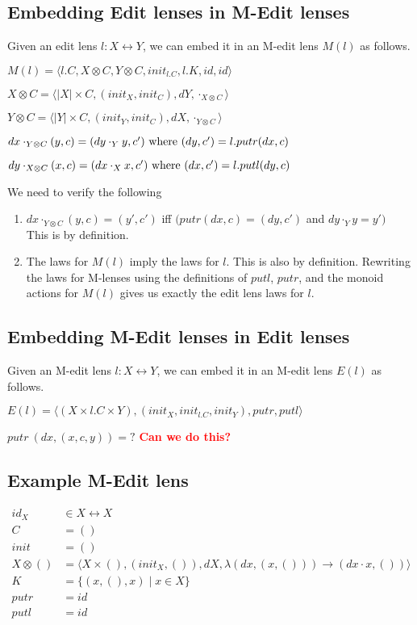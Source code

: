 \documentclass[a4paper,10pt]{article}
\newcommand{\finish}[1]{#1}
\newcommand{\comment}[1]{\finish{\textbf{\textcolor{red}{#1}}}}
\begin{document}
\subsection{Embedding Edit lenses in M-Edit lenses}
Given an edit lens $l:X \leftrightarrow Y$, we can embed it in an M-edit lens $M(l)$ as follows. 

$M(l) = \langle l.C, X \otimes C, Y \otimes C, init_{l.C}, l.K, id, id \rangle$

$X \otimes C = \langle |X| \times C, (init_X, init_C), dY, \cdot_{X \otimes C} \rangle$

$Y \otimes C = \langle |Y| \times C, (init_Y, init_C), dX, \cdot_{Y \otimes C} \rangle$

$ dx \cdot_{Y \otimes C} (y,c) = (dy \cdot_Y y, c') \textnormal{ where } (dy, c') = l.putr (dx, c)$

$ dy \cdot_{X \otimes C} (x,c) = (dx \cdot_X x, c') \textnormal{ where } (dx, c') = l.putl (dy, c)$

We need to verify the following
\begin{enumerate}
 \item $dx \cdot_{Y \otimes C} (y,c) = (y', c')$ iff $(putr (dx, c) = (dy, c')$ and $dy \cdot_Y y = y')$\\
       This is by definition.
 \item The laws for $M(l)$ imply the laws for $l$.
       This is also by definition. Rewriting the laws for M-lenses using the definitions of $putl$, $putr$, and the monoid actions for $M(l)$ gives us exactly the edit lens laws for $l$.
\end{enumerate}

\subsection{Embedding M-Edit lenses in Edit lenses}
Given an M-edit lens $l:X \leftrightarrow Y$, we can embed it in an M-edit lens $E(l)$ as follows. 

$E(l) = \langle (X \times l.C \times Y), (init_X, init_{l.C}, init_Y), putr, putl \rangle $

$putr~(dx, (x,c,y)) = ?$ \comment{Can we do this?}


\subsection{Example M-Edit lens}
  \begin{align*}
    id_X &\in X \leftrightarrow X \\
    C &= () \\
    init &= () \\
    X \otimes () &= \langle X \times (), (init_X, ()), dX, \lambda (dx,(x,())) \to (dx \cdot x, ()) \rangle \\
    K &= \{ (x, (), x) \mid x \in X \} \\
    putr &= id \\
    putl &= id
  \end{align*}
  
\end{document}
